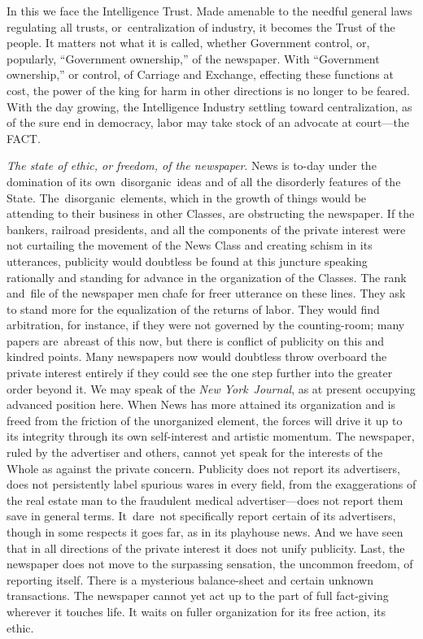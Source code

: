 \documentclass[twoside,symmetric,nobib,justified]{tufte-book}
\begin{document}
In this we face the Intelligence Trust. Made amenable to the needful
general laws regulating all trusts, or~centralization of industry, it
becomes the Trust of the people. It matters not what it is called,
whether Government control, or, popularly, ``Government ownership,'' of
the newspaper. With ``Government ownership,'' or control, of Carriage
and Exchange, effecting these functions at cost, the power of the king
for harm in other directions is no longer to be feared. With the day
growing, the Intelligence Industry settling toward centralization, as of
the sure end in democracy, labor may take stock of an advocate at
court---the FACT.~

\vspace{0.05in}


\emph{The state of ethic, or freedom, of the newspaper}. News is to-day
under the domination of its own~disorganic~ideas and of all the
disorderly features of the State. The~disorganic~elements, which in the
growth of things would be attending to their business in other Classes,
are obstructing the newspaper. If the bankers, railroad presidents, and
all the components of the private interest were not curtailing the
movement of the News Class and creating schism in its utterances,
publicity would doubtless be found at this juncture speaking rationally
and standing for advance in the organization of the Classes. The rank
and~file of the newspaper men chafe for freer utterance on these lines.
They ask to stand more for the equalization of the returns of labor.
They would find arbitration, for instance, if they were not governed by
the counting-room; many papers are~abreast of this now, but there is
conflict of publicity on this and kindred points. Many newspapers now
would doubtless throw overboard the private interest entirely if they
could see the one step further into the greater order beyond it. We may
speak of the \emph{New York}~\emph{Journal}, as at present occupying
advanced position here. When News has more attained its organization and
is freed from the friction of the unorganized element, the forces will
drive it up to its integrity through its own self-interest and artistic
momentum. The newspaper, ruled by the advertiser and others, cannot yet
speak for the interests of the Whole as against the private concern.
Publicity does not report its advertisers, does not persistently label
spurious wares in every field, from the exaggerations of the real estate
man to the fraudulent medical advertiser---does not report them save in
general terms. It~dare~not specifically report certain of its
advertisers, though in some respects it goes far, as in its playhouse
news. And we have seen that in all directions of the private interest it
does not unify publicity. Last, the newspaper does not move to the
surpassing sensation, the uncommon freedom, of reporting itself. There
is a mysterious balance-sheet and certain unknown transactions. The
newspaper cannot yet act up to the part of full fact-giving wherever it
touches life. It waits on fuller organization for its free action, its
ethic.~
\end{document}

